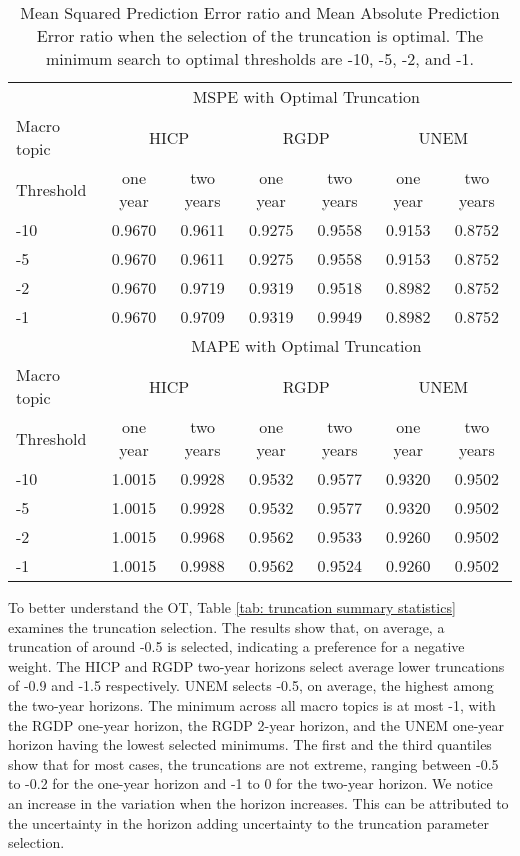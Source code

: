 \documentclass[11pt]{article}
\begin{document}
	\begin{table}[!h]
		\centering
		\caption{Mean Squared Prediction Error ratio and Mean Absolute Prediction Error ratio when the selection of the truncation is optimal. The minimum search to optimal thresholds are -10, -5, -2, and -1.}
		\label{tab: oos mspe}
		\begin{tabular}{lcccccc}
			\hline
			&\multicolumn{6}{c}{MSPE with Optimal Truncation}\\
			\cmidrule(lr){2-7}
			Macro topic & \multicolumn{2}{c}{HICP} & \multicolumn{2}{c}{RGDP} & \multicolumn{2}{c}{UNEM} \\
			\cmidrule(lr){2-3} \cmidrule(lr){4-5}\cmidrule(lr){6-7}
			Threshold     & one year & two years & one year & two years & one year & two years \\ 
			\hline
			-10 & 0.9670   & 0.9611   & 0.9275   & 0.9558   & 0.9153   & 0.8752   \\ 
			-5  & 0.9670   & 0.9611   & 0.9275   & 0.9558   & 0.9153   & 0.8752   \\ 
			-2  & 0.9670   & 0.9719   & 0.9319   & 0.9518   & 0.8982   & 0.8752   \\ 
			-1  & 0.9670   & 0.9709   & 0.9319   & 0.9949   & 0.8982   & 0.8752   \\ 
			\hline
			&\multicolumn{6}{c}{MAPE with Optimal Truncation}\\
			\cmidrule(lr){2-7}
			Macro topic & \multicolumn{2}{c}{HICP} & \multicolumn{2}{c}{RGDP} & \multicolumn{2}{c}{UNEM} \\
			\cmidrule(lr){2-3} \cmidrule(lr){4-5}\cmidrule(lr){6-7}
			Threshold     & one year & two years & one year & two years & one year & two years \\ 
			\hline
			-10 & 1.0015   & 0.9928   & 0.9532   & 0.9577   & 0.9320   & 0.9502   \\
			-5  & 1.0015   & 0.9928   & 0.9532   & 0.9577   & 0.9320   & 0.9502   \\
			-2  & 1.0015   & 0.9968   & 0.9562   & 0.9533   & 0.9260   & 0.9502   \\
			-1  & 1.0015   & 0.9988   & 0.9562   & 0.9524   & 0.9260   & 0.9502   \\
			\hline
		\end{tabular}
	\end{table}
	
	To better understand the OT, Table \ref{tab: truncation summary statistics} examines the truncation selection. The results show that, on average, a truncation of around -0.5 is selected, indicating a preference for a negative weight. The HICP and RGDP two-year horizons select average lower truncations of -0.9 and -1.5 respectively. UNEM selects -0.5, on average, the highest among the two-year horizons. The minimum across all macro topics is at most -1, with the RGDP one-year horizon, the RGDP 2-year horizon, and the UNEM one-year horizon having the lowest selected minimums. The first and the third quantiles show that for most cases, the truncations are not extreme, ranging between -0.5 to -0.2 for the one-year horizon and -1 to 0 for the two-year horizon. We notice an increase in the variation when the horizon increases. This can be attributed to the uncertainty in the horizon adding uncertainty to the truncation parameter selection.
	
\end{document}
